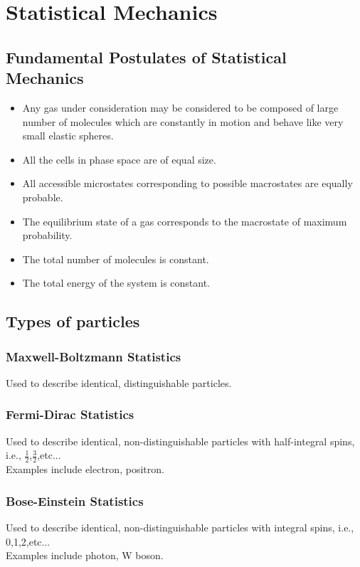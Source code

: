\documentclass{article}
\numberwithin{equation}{section}
\begin{document}
\section{Statistical Mechanics}
\subsection{Fundamental Postulates of Statistical Mechanics}
\begin{itemize}
\item Any gas under consideration may be considered to be composed of large number of molecules which are constantly in motion and behave like very small elastic spheres.
\item All the cells in phase space are of equal size.
\item All accessible microstates corresponding to possible macrostates are equally probable.
\item The equilibrium state of a gas corresponds to the macrostate of maximum probability.
\item The total number of molecules is constant.
\item The total energy of the system is constant.
\end{itemize}

\subsection{Types of particles}
\subsubsection{Maxwell-Boltzmann Statistics}
Used to describe identical, distinguishable particles.
\subsubsection{Fermi-Dirac Statistics}
Used to describe identical, non-distinguishable particles with half-integral spins, i.e., $\frac{1}{2}$,$\frac{3}{2}$,etc...\\
Examples include electron, positron.
\subsubsection{Bose-Einstein Statistics}
Used to describe identical, non-distinguishable particles with integral spins, i.e., 0,1,2,etc...\\
Examples include photon, W boson.
\end{document}
